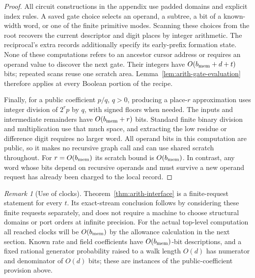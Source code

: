 \documentclass[11pt]{article}
\numberwithin{equation}{section}
\theoremstyle{definition}
\theoremstyle{remark}
\newtheorem{remark}[theorem]{Remark}
\begin{document}
\begin{proof}
All circuit constructions in the appendix use padded domains and explicit index rules.  A saved gate choice selects an operand, a subtree,
a bit of a known-width word, or one of the finite primitive modes.
Scanning these choices from the root recovers the current
descriptor and digit places by integer arithmetic.  The
reciprocal's extra records additionally specify its early-prefix
formation state.  None of these computations refers to an
ancestor cursor address or requires an operand value to discover
the next gate.  Their integers have $O({b_{\rm mem}}+d+t)$ bits; repeated
scans reuse one scratch area.  Lemma~\ref{lem:arith-gate-evaluation}
therefore applies at every Boolean portion of the recipe.

Finally, for a public coefficient ${p}/{q}$, ${q}>0$, producing a
place-$r$ approximation uses integer division of $2^r{p}$ by ${q}$,
with signed floors when needed.  The inputs and intermediate
remainders have $O({b_{\rm mem}}+r)$ bits.  Standard finite binary division
and multiplication use that much space, and extracting the
low residue or difference digit requires no larger word.
All operand bits in this computation are public, so it makes no
recursive graph call and can use shared scratch throughout.
For $r=O({b_{\rm mem}})$ its scratch bound is $O({b_{\rm mem}})$.  In contrast, any word
whose bits depend on recursive operands and must survive a new
operand request has already been charged to the local record.
\end{proof}

\begin{remark}[Use of clocks]
\label{rem:arith-clocks}
Theorem~\ref{thm:arith-interface} is a finite-request statement
for every $t$.  Its exact-stream conclusion follows by considering
these finite requests separately, and does not require a machine
to choose structural domains or port orders at infinite precision.
For the actual top-level computation all reached clocks will be
$O({b_{\rm mem}})$ by the allowance calculation in the next section.  Known
rate and field coefficients have $O({b_{\rm mem}})$-bit descriptions, and a
fixed rational generator probability raised to a walk length
$O(d)$ has numerator and denominator of $O(d)$ bits; these are
instances of the public-coefficient provision above.
\end{remark}





\end{document}
